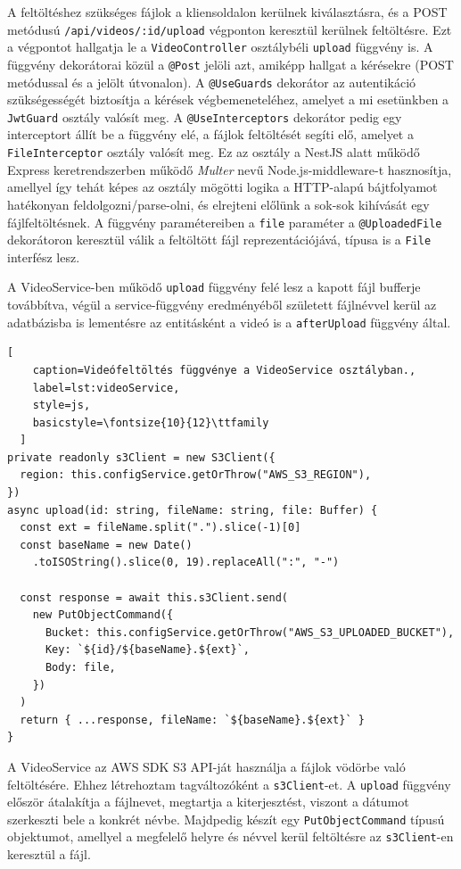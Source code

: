 A feltöltéshez szükséges fájlok a kliensoldalon kerülnek kiválasztásra, és a POST metódusú \verb|/api/videos/:id/upload| végponton keresztül kerülnek feltöltésre. Ezt a végpontot hallgatja le a \verb|VideoController| osztálybéli \verb|upload| függvény is. A függvény dekorátorai közül a \verb|@Post| jelöli azt, amiképp hallgat a kérésekre (POST metódussal és a jelölt útvonalon). A \verb|@UseGuards| dekorátor az autentikáció szükségességét biztosítja a kérések végbemeneteléhez, amelyet a mi esetünkben a \verb|JwtGuard| osztály valósít meg. A \verb|@UseInterceptors| dekorátor pedig egy interceptort állít be a függvény elé, a fájlok feltöltését segíti elő, amelyet a \verb|FileInterceptor| osztály valósít meg. Ez az osztály a NestJS alatt működő Express keretrendszerben működő \emph{Multer} nevű Node.js-middleware-t hasznosítja, amellyel így tehát képes az osztály mögötti logika a HTTP-alapú bájtfolyamot hatékonyan feldolgozni/parse-olni, és elrejteni előlünk a sok-sok kihívását egy fájlfeltöltésnek. A függvény paramétereiben a \verb|file| paraméter a \verb|@UploadedFile| dekorátoron keresztül válik a feltöltött fájl reprezentációjává, típusa is a \verb|File| interfész lesz.

A VideoService-ben működő \verb|upload| függvény felé lesz a kapott fájl bufferje továbbítva, végül a service-függvény eredményéből született fájlnévvel kerül az adatbázisba is lementésre az entitásként a videó is a \verb|afterUpload| függvény által.

\begin{minipage}{0.92\textwidth}
  \begin{lstlisting}[
    caption=Videófeltöltés függvénye a VideoService osztályban.,
    label=lst:videoService,
    style=js,
    basicstyle=\fontsize{10}{12}\ttfamily
  ]
private readonly s3Client = new S3Client({
  region: this.configService.getOrThrow("AWS_S3_REGION"),
})
async upload(id: string, fileName: string, file: Buffer) {
  const ext = fileName.split(".").slice(-1)[0]
  const baseName = new Date()
    .toISOString().slice(0, 19).replaceAll(":", "-")

  const response = await this.s3Client.send(
    new PutObjectCommand({
      Bucket: this.configService.getOrThrow("AWS_S3_UPLOADED_BUCKET"),
      Key: `${id}/${baseName}.${ext}`,
      Body: file,
    })
  )
  return { ...response, fileName: `${baseName}.${ext}` }
}
\end{lstlisting}
\end{minipage}

A VideoService az AWS SDK S3 API-ját használja a fájlok vödörbe való feltöltésére. Ehhez létrehoztam tagváltozóként a \verb|s3Client|-et. A \verb|upload| függvény először átalakítja a fájlnevet, megtartja a kiterjesztést, viszont a dátumot szerkeszti bele a konkrét névbe. Majdpedig készít egy \verb|PutObjectCommand| típusú objektumot, amellyel a megfelelő helyre és névvel kerül feltöltésre az \verb|s3Client|-en keresztül a fájl.


